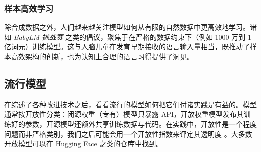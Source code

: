 \subsubsection{样本高效学习}
除合成数据之外，人们越来越关注模型如何从有限的自然数据中更高效地学习。诸如 \emph{BabyLM 挑战赛} \citep{warstadt-etal-2023-findings} 之类的倡议，聚焦于在严格的数据约束下（例如 1000 万到 1 亿词元）训练模型。这与人脑儿童在发育早期接收的语言输入量相当，既推动了样本高效架构的创新，也为认知上合理的语言习得提供了洞见。

\subsection{流行模型}
在综述了各种改进技术之后，看看流行的模型如何把它们付诸实践是有益的。模型通常按开放性分类：闭源权重（专有）模型只暴露 API，开放权重模型发布其训练好的参数，开源模型还额外共享训练数据与代码。在实践中，开放性是一个程度问题而非严格类别，我们之后可能会用一个开放性指数来评定其透明度 \citep{artificialanalysis_openness}。大多数开放模型可以在 Hugging Face 之类的仓库中找到。

